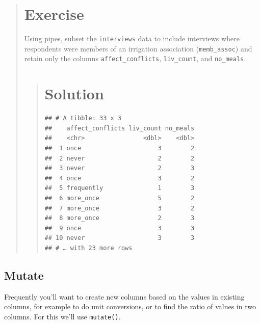 \documentclass[]{book}
\newenvironment{Shaded}{\begin{snugshade}}{\end{snugshade}}
\newcommand{\KeywordTok}[1]{\textcolor[rgb]{0.13,0.29,0.53}{\textbf{#1}}}
\newcommand{\StringTok}[1]{\textcolor[rgb]{0.31,0.60,0.02}{#1}}
\newcommand{\OperatorTok}[1]{\textcolor[rgb]{0.81,0.36,0.00}{\textbf{#1}}}
\newcommand{\NormalTok}[1]{#1}
\begin{document}
\begin{quote}
\section{Exercise}\label{exercise-7}

Using pipes, subset the \texttt{interviews} data to include interviews
where respondents were members of an irrigation association
(\texttt{memb\_assoc}) and retain only the columns
\texttt{affect\_conflicts}, \texttt{liv\_count}, and \texttt{no\_meals}.

\begin{quote}
\section{Solution}\label{solution-6}

\begin{Shaded}
\end{Shaded}

\begin{verbatim}
## # A tibble: 33 x 3
##    affect_conflicts liv_count no_meals
##    <chr>                <dbl>    <dbl>
##  1 once                     3        2
##  2 never                    2        2
##  3 never                    2        3
##  4 once                     3        2
##  5 frequently               1        3
##  6 more_once                5        2
##  7 more_once                3        2
##  8 more_once                2        3
##  9 once                     3        3
## 10 never                    3        3
## # … with 23 more rows
\end{verbatim}
\end{quote}
\end{quote}

\subsection{Mutate}\label{mutate}

Frequently you'll want to create new columns based on the values in
existing columns, for example to do unit conversions, or to find the
ratio of values in two columns. For this we'll use \texttt{mutate()}.
\end{document}

